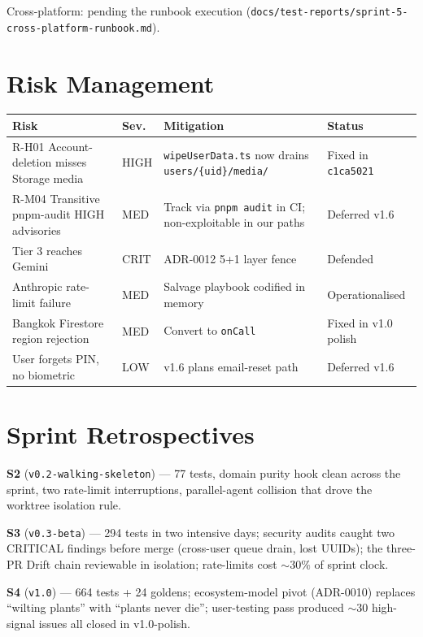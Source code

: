 \documentclass[11pt,a4paper]{article}
\begin{document}
Cross-platform: pending the runbook execution
(\texttt{docs/test-reports/sprint-5-cross-platform-runbook.md}).

\section{Risk Management}

\begin{longtable}{p{4cm}lp{4cm}p{4cm}}
\toprule
\textbf{Risk} & \textbf{Sev.} & \textbf{Mitigation} & \textbf{Status} \\
\midrule
R-H01 Account-deletion misses Storage media & HIGH & \texttt{wipeUserData.ts} now drains \texttt{users/\{uid\}/media/} & Fixed in \texttt{c1ca5021} \\
R-M04 Transitive pnpm-audit HIGH advisories & MED & Track via \texttt{pnpm audit} in CI; non-exploitable in our paths & Deferred v1.6 \\
Tier 3 reaches Gemini & CRIT & ADR-0012 5+1 layer fence & Defended \\
Anthropic rate-limit failure & MED & Salvage playbook codified in memory & Operationalised \\
Bangkok Firestore region rejection & MED & Convert to \texttt{onCall} & Fixed in v1.0 polish \\
User forgets PIN, no biometric & LOW & v1.6 plans email-reset path & Deferred v1.6 \\
\bottomrule
\end{longtable}

\section{Sprint Retrospectives}

\textbf{S2} (\texttt{v0.2-walking-skeleton}) --- 77 tests, domain
purity hook clean across the sprint, two rate-limit interruptions,
parallel-agent collision that drove the worktree isolation rule.

\textbf{S3} (\texttt{v0.3-beta}) --- 294 tests in two intensive days;
security audits caught two CRITICAL findings before merge (cross-user
queue drain, lost UUIDs); the three-PR Drift chain reviewable in
isolation; rate-limits cost $\sim 30\%$ of sprint clock.

\textbf{S4} (\texttt{v1.0}) --- 664 tests + 24 goldens; ecosystem-model
pivot (ADR-0010) replaces ``wilting plants'' with ``plants never die'';
user-testing pass produced $\sim 30$ high-signal issues all closed in
v1.0-polish.
\end{document}
